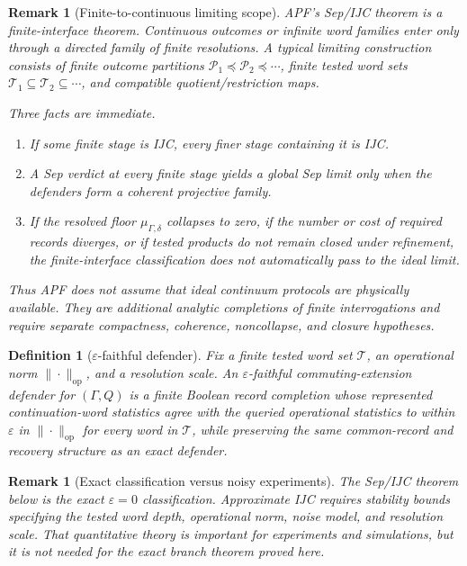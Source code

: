 \documentclass[11pt]{article}
\newtheorem{definition}[theorem]{Definition}
\newtheorem{remark}[theorem]{Remark}
\begin{document}
\begin{remark}[Finite-to-continuous limiting scope]\label{rem:finite-to-continuous-scope}
APF's Sep/IJC theorem is a finite-interface theorem.  Continuous outcomes or infinite word families enter only through a directed family of finite resolutions.  A typical limiting construction consists of finite outcome partitions
\(\mathcal P_1\preceq\mathcal P_2\preceq\cdots\), finite tested word sets
\(\mathcal T_1\subseteq\mathcal T_2\subseteq\cdots\), and compatible quotient/restriction maps.

Three facts are immediate.
\begin{enumerate}[label=(\roman*),leftmargin=2em]
\item If some finite stage is IJC, every finer stage containing it is IJC.
\item A Sep verdict at every finite stage yields a global Sep limit only when the defenders form a coherent projective family.
\item If the resolved floor \(\mu_{\Gamma,\delta}\) collapses to zero, if the number or cost of required records diverges, or if tested products do not remain closed under refinement, the finite-interface classification does not automatically pass to the ideal limit.
\end{enumerate}
Thus APF does not assume that ideal continuum protocols are physically available.  They are additional analytic completions of finite interrogations and require separate compactness, coherence, noncollapse, and closure hypotheses.
\end{remark}

\begin{definition}[$\varepsilon$-faithful defender]\label{def:epsilon-defender}
Fix a finite tested word set $\mathcal T$, an operational norm $\|\cdot\|_{\mathrm{op}}$, and a resolution scale.  An $\varepsilon$-faithful commuting-extension defender for $(\Gamma,Q)$ is a finite Boolean record completion whose represented continuation-word statistics agree with the queried operational statistics to within $\varepsilon$ in $\|\cdot\|_{\mathrm{op}}$ for every word in $\mathcal T$, while preserving the same common-record and recovery structure as an exact defender.
\end{definition}

\begin{remark}[Exact classification versus noisy experiments]\label{rem:epsilon-ijc}
The Sep/IJC theorem below is the exact $\varepsilon=0$ classification.  Approximate IJC requires stability bounds specifying the tested word depth, operational norm, noise model, and resolution scale.  That quantitative theory is important for experiments and simulations, but it is not needed for the exact branch theorem proved here.
\end{remark}
\end{document}
